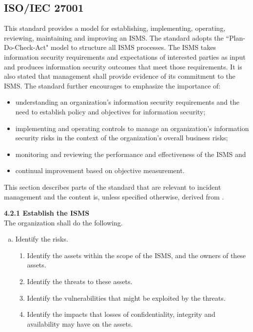 \subsection{\acs{ISO}/\acs{IEC} 27001}
\label{sec:iso27001}
This standard provides a model for establishing, implementing, operating, reviewing, maintaining and improving an \ac{ISMS}. The standard adopts the ``Plan-Do-Check-Act" model to structure all \ac{ISMS} processes. The \ac{ISMS} takes information security requirements and expectations of interested parties as input and produces information security outcomes that meet those requirements. It is also stated that management shall provide evidence of its commitment to the ISMS. The standard further encourages to emphasize the importance of:

\begin{itemize}\itemsep-0.2cm
\item understanding an organization's information security requirements and the need to establish policy and objectives for information security;
\item implementing and operating controls to manage an organization's information security risks in the context of the organization's overall business risks;
\item monitoring and reviewing the performance and effectiveness of the \ac{ISMS} and
\item continual improvement based on objective measurement.
\end{itemize}

This section describes parts of the standard that are relevant to incident management and the content is, unless specified otherwise, derived from \cite{ISO/IEC27001}.

\textbf{4.2.1 Establish the \ac{ISMS} } \\
The organization shall do the following.
\begin{enumerate}[d)]
\item Identify the risks.
\begin{enumerate}[1)]\itemsep-0.2cm
\item Identify the assets within the scope of the \ac{ISMS}, and the owners of these assets.
\item Identify the threats to these assets.
\item Identify the vulnerabilities that might be exploited by the threats.
\item Identify the impacts that losses of confidentiality, integrity and availability may have on the assets.
\end{enumerate}
\end{enumerate}

